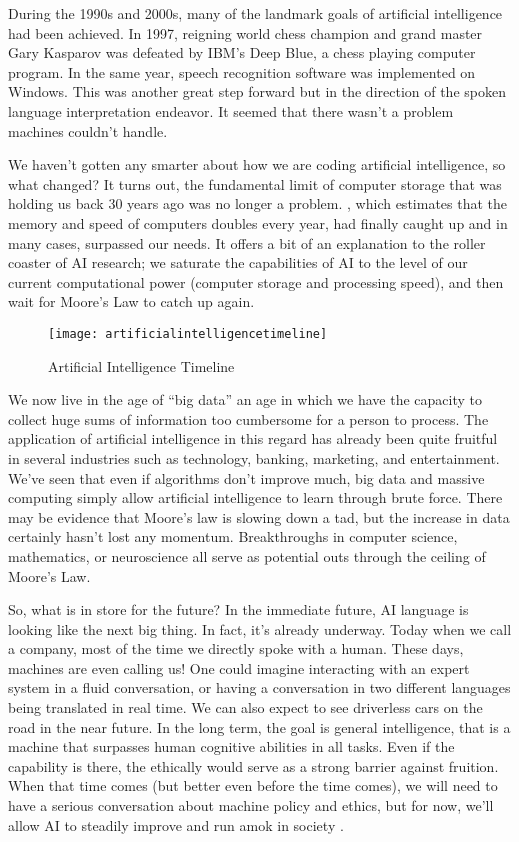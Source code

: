 During the 1990s and 2000s, many of the landmark goals of artificial intelligence had been achieved. In 1997, reigning world chess champion and grand master Gary Kasparov was defeated by IBM’s Deep Blue, a chess playing computer program. In the same year, speech recognition software was implemented on Windows. This was another great step forward but in the direction of the spoken language interpretation endeavor. It seemed that there wasn’t a problem machines couldn’t handle.

We haven’t gotten any smarter about how we are coding artificial intelligence, so what changed? It turns out, the fundamental limit of computer storage that was holding us back 30 years ago was no longer a problem.  , which estimates that the memory and speed of computers doubles every year, had finally caught up and in many cases, surpassed our needs. It offers a bit of an explanation to the roller coaster of AI research; we saturate the capabilities of AI to the level of our current computational power (computer storage and processing speed), and then wait for Moore’s Law to catch up again.

\begin{figure}
	\centering
	\texttt{[image: artificialintelligencetimeline]}
	\caption{Artificial Intelligence Timeline}
	\label{fig:pmc}
\end{figure}

We now live in the age of \enquote{big data} an age in which we have the capacity to collect huge sums of information too cumbersome for a person to process. The application of artificial intelligence in this regard has already been quite fruitful in several industries such as technology, banking, marketing, and entertainment. We’ve seen that even if algorithms don’t improve much, big data and massive computing simply allow artificial intelligence to learn through brute force. There may be evidence that Moore’s law is slowing down a tad, but the increase in data certainly hasn’t lost any momentum. Breakthroughs in computer science, mathematics, or neuroscience all serve as potential outs through the ceiling of Moore’s Law.

So, what is in store for the future? In the immediate future, AI language is looking like the next big thing. In fact, it’s already underway. Today when we call a company, most of the time we directly spoke with a human. These days, machines are even calling us! One could imagine interacting with an expert system in a fluid conversation, or having a conversation in two different languages being translated in real time. We can also expect to see driverless cars on the road in the near future. In the long term, the goal is general intelligence, that is a machine that surpasses human cognitive abilities in all tasks. Even if the capability is there, the ethically would serve as a strong barrier against fruition. When that time comes (but better even before the time comes), we will need to have a serious conversation about machine policy and ethics, but for now, we’ll allow AI to steadily improve and run amok in society \citep{AnyohaRockwellHistoryArtificialIntelligence2017}.

